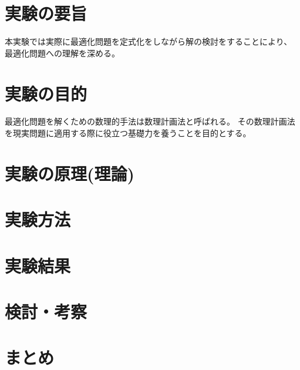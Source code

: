\documentclass[12pt]{jarticle}
\begin{document}



\section{実験の要旨}
本実験では実際に最適化問題を定式化をしながら解の検討をすることにより、
最適化問題への理解を深める。

\section{実験の目的}
最適化問題を解くための数理的手法は数理計画法と呼ばれる。
その数理計画法を現実問題に適用する際に役立つ基礎力を養うことを目的とする。

\section{実験の原理(理論)}

\section{実験方法}

\section{実験結果}

\section{検討・考察}

\section{まとめ}
\end{document}
